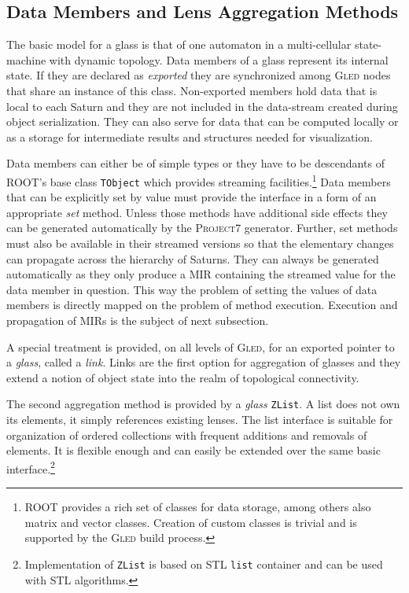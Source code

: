 \documentclass[final]{siamltex}
\def\gled{\textsc{Gled}\xspace}
\def\p7{\textsc{Project7}\xspace}
\def\smalltt#1{{\small\texttt{#1}}}
\begin{document}
\subsection{Data Members and Lens Aggregation Methods}
\label{ssec:dm_dmlam}

The basic model for a glass is that of one automaton in a
multi-cellular state-machine with dynamic topology. Data members of a
glass represent its internal state. If they are declared as
\emph{exported} they are synchronized among \gled nodes that share an
instance of this class. Non-exported members hold data that is local
to each Saturn and they are not included in the data-stream created
during object serialization. They can also serve for data that can be
computed locally or as a storage for intermediate results and
structures needed for visualization.

Data members can either be of simple types or they have to be
descendants of ROOT's base class \smalltt{TObject} which provides
streaming facilities.\footnote{%
  ROOT provides a rich set of classes for data storage, among others
  also matrix and vector classes. Creation of custom classes is
  trivial and is supported by the \gled build process.} %
Data members that can be explicitly set by value must provide the
interface in a form of an appropriate \emph{set} method. Unless those
methods have additional side effects they can be generated
automatically by the \p7 generator. Further, set methods must also be
available in their streamed versions so that the elementary changes
can propagate across the hierarchy of Saturns. They can always be
generated automatically as they only produce a MIR containing the
streamed value for the data member in question. This way the problem
of setting the values of data members is directly mapped on the
problem of method execution. Execution and propagation of MIRs is the
subject of next subsection.

A special treatment is provided, on all levels of \gled, for an
exported pointer to a \emph{glass}, called a \emph{link}. Links are
the first option for aggregation of glasses and they extend a notion
of object state into the realm of topological connectivity.

The second aggregation method is provided by a \emph{glass}
\smalltt{ZList}. A list does not own its elements, it simply
references existing lenses. The list interface is suitable for
organization of ordered collections with frequent additions and
removals of elements. It is flexible enough and can easily be extended
over the same basic interface.\footnote{Implementation of
  \smalltt{ZList} is based on STL \smalltt{list} container and can be
  used with STL algorithms.}
\end{document}
